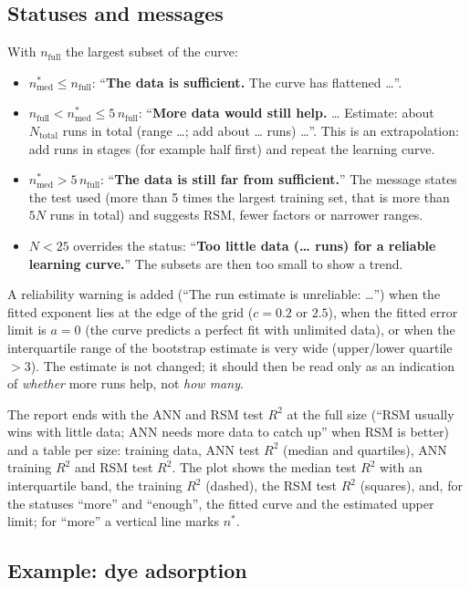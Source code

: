 \subsection{Statuses and messages}

With $n_\text{full}$ the largest subset of the curve:
\begin{itemize}
  \item $n^*_\text{med} \le n_\text{full}$: ``\textbf{The data is sufficient.} The curve has flattened \dots''.
  \item $n_\text{full} < n^*_\text{med} \le 5\,n_\text{full}$: ``\textbf{More data would still help.} \dots{}
    Estimate: about $N_\text{total}$ runs in total (range \dots; add about \dots{} runs) \dots''. This is an
    extrapolation: add runs in stages (for example half first) and repeat the learning curve.
  \item $n^*_\text{med} > 5\,n_\text{full}$: ``\textbf{The data is still far from sufficient.}'' The message states
    the test used (more than 5 times the largest training set, that is more than $5N$ runs in total) and suggests
    RSM, fewer factors or narrower ranges.
  \item $N < 25$ overrides the status: ``\textbf{Too little data (\dots{} runs) for a reliable learning curve.}''
    The subsets are then too small to show a trend.
\end{itemize}
A reliability warning is added (``The run estimate is unreliable: \dots'') when the fitted exponent lies at the
edge of the grid ($c = 0.2$ or $2.5$), when the fitted error limit is $a = 0$ (the curve predicts a perfect fit with
unlimited data), or when the interquartile range of the bootstrap estimate is very wide (upper/lower quartile $>
3$). The estimate is not changed; it should then be read only as an indication of \emph{whether} more runs help,
not \emph{how many}.

The report ends with the ANN and RSM test $R^2$ at the full size (``RSM usually wins with little data; ANN needs
more data to catch up'' when RSM is better) and a table per size: training data, ANN test $R^2$ (median and
quartiles), ANN training $R^2$ and RSM test $R^2$. The plot shows the median test $R^2$ with an interquartile band,
the training $R^2$ (dashed), the RSM test $R^2$ (squares), and, for the statuses ``more'' and ``enough'', the
fitted curve and the estimated upper limit; for ``more'' a vertical line marks $n^*$.

\subsection{Example: dye adsorption}

